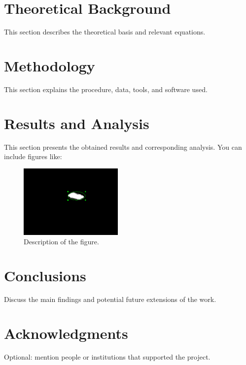 \documentclass[aps,prd,nofootinbib,superscriptaddress,floatfix,longbibliography,author-year]{revtex4-2}
\begin{document}
\section{Theoretical Background}
This section describes the theoretical basis and relevant equations.

\section{Methodology}
This section explains the procedure, data, tools, and software used.

\section{Results and Analysis}
This section presents the obtained results and corresponding analysis. You can include figures like:
\begin{figure}[h]
    \centering
    \includegraphics[width=0.45\textwidth]{Images/Ellipse_region.png}
    \caption{Description of the figure.}
    \label{fig:example}
\end{figure}

\section{Conclusions}
Discuss the main findings and potential future extensions of the work.

\section*{Acknowledgments}
Optional: mention people or institutions that supported the project.

\end{document}
